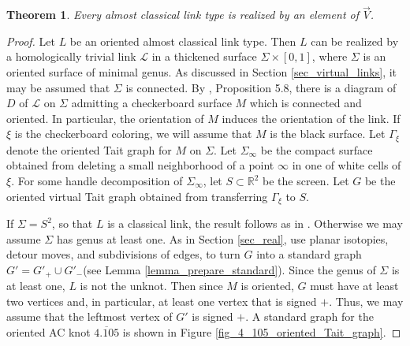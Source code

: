 \documentclass[11pt, twoside]{amsart}
\numberwithin{equation}{section}
\newtheorem{theorem}{Theorem}[subsection]
\theoremstyle{definition}
\numberwithin{equation}{section}
\begin{document}
\begin{theorem}\label{thm: oriented realization} Every almost classical link type is realized by an element of $\vec{V}$.
\end{theorem}
\begin{proof} Let $L$ be an oriented almost classical link type. Then $L$ can be realized by a homologically trivial link $\mathcal{L}$ in a thickened surface $\Sigma \times [0,1]$, where $\Sigma$ is an oriented surface of minimal genus. As discussed in Section \ref{sec_virtual_links}, it may be assumed that $\Sigma$ is connected. By \cite{boden_chrisman_karimi}, Proposition 5.8, there is a diagram of $D$ of $\mathcal{L}$ on $\Sigma$ admitting a checkerboard surface $M$ which is connected and oriented. In particular, the orientation of $M$ induces the orientation of the link. If $\xi$ is the checkerboard coloring, we will assume that $M$ is the black surface. Let $\Gamma_{\xi}$ denote the oriented Tait graph for $M$ on $\Sigma$. Let $\Sigma_{\infty}$ be the compact surface obtained from deleting a small neighborhood of a point $\infty$ in one of white cells of $\xi$. For some handle decomposition of $\Sigma_{\infty}$, let $S \subset \mathbb{R}^2$ be the screen. Let $G$ be the oriented virtual Tait graph obtained from transferring $\Gamma_{\xi}$ to $S$. 

If $\Sigma=S^2$, so that $L$ is a classical link, the result follows as in \cite{aiello_oriented}. Otherwise we may assume $\Sigma$ has genus at least one. As in Section \ref{sec_real}, use planar isotopies, detour moves, and subdivisions of edges, to turn $G$ into a standard graph $G'=G'_+ \cup G'_- $(see Lemma \ref{lemma_prepare_standard}). Since the genus of $\Sigma$ is at least one, $L$ is not the unknot. Then since $M$ is oriented, $G$ must have at least two vertices and, in particular, at least one vertex that is signed $+$. Thus, we may assume that the leftmost vertex of $G'$ is signed $+$.  A standard graph for the oriented AC knot  $\overline{4.105}$ is shown in Figure \ref{fig_4_105_oriented_Tait_graph}. 


\end{proof}
\end{document}
